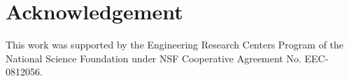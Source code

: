 \section{Acknowledgement}
This work was supported by the Engineering Research Centers Program of the National Science Foundation under NSF Cooperative Agreement No. EEC-0812056.